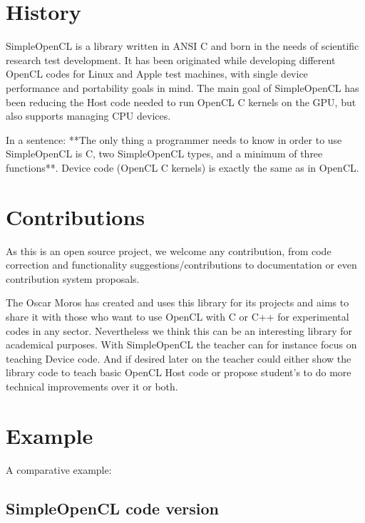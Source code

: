 \documentclass{article}
\begin{document}
\section{History}
SimpleOpenCL is a library written in ANSI C and born in the needs of scientific research test development. It has been originated while developing different OpenCL codes for Linux and Apple test machines, with single device performance and portability goals in mind. The main goal of SimpleOpenCL has been reducing the Host code needed to run OpenCL C kernels on the GPU, but also supports managing CPU devices. 

In a sentence: **The only thing a programmer needs to know in order to use SimpleOpenCL is C, two SimpleOpenCL types, and a minimum of three functions**. 
Device code (OpenCL C kernels) is exactly the same as in OpenCL.

\section{Contributions}
As this is an open source project, we welcome any contribution, from code correction and functionality suggestions/contributions to documentation or even contribution system proposals.

The Oscar Moros has created and uses this library for its projects and aims to share it with those who want to use OpenCL with C or C++ for experimental codes in any sector. Nevertheless we think this can be an interesting library for academical purposes. With SimpleOpenCL the teacher can for instance focus on teaching Device code. And if desired later on the teacher could either show the library code to teach basic OpenCL Host code or propose student's to do more technical improvements over it or both.

\section{Example}
A comparative example:

\subsection{SimpleOpenCL code version}
\end{document}
